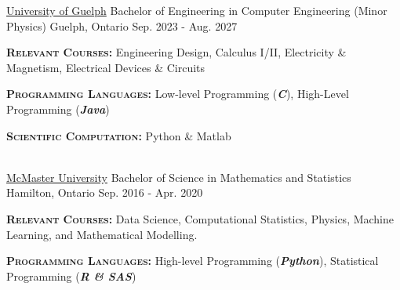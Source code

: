 


\begin{cventries}

\cventry
 {\href{https://www.uoguelph.ca/engineering/undergraduate/future-students/computer/}{University of Guelph}} %
    {Bachelor of Engineering in Computer Engineering (Minor Physics)} %
    {Guelph, Ontario} %
    {Sep. 2023 - Aug. 2027} %
       {
    \begin{cvitems} %
        \item{\textsc{\textbf{Relevant Courses:}} Engineering Design, Calculus I/II, Electricity \& Magnetism, Electrical Devices \& Circuits }
        \item{\textsc{\textbf{Programming Languages:}} Low-level Programming (\textbf{\textit{C}}), High-Level Programming (\textbf{\textit{Java}})}
        \item{\textsc{\textbf{Scientific Computation:}} Python \& Matlab}
    \end{cvitems}
    }\\ \vspace{0.15cm}
\cventry
{\href{https://www.math.mcmaster.ca/undergraduate/undergrad-welcome.html}{McMaster University}} %
    {Bachelor of Science in Mathematics and Statistics} %
    {Hamilton, Ontario} %
    {Sep. 2016 - Apr. 2020} %
    {
    \begin{cvitems} %
        \item{\textsc{\textbf{Relevant Courses:}} Data Science, Computational Statistics, Physics, Machine Learning, and Mathematical Modelling.}
        \item{\textsc{\textbf{Programming Languages:}} High-level Programming (\textbf{\textit{Python}}), Statistical Programming (\textbf{\textit{R \& SAS}})}
    \end{cvitems}
    }

\end{cventries}

